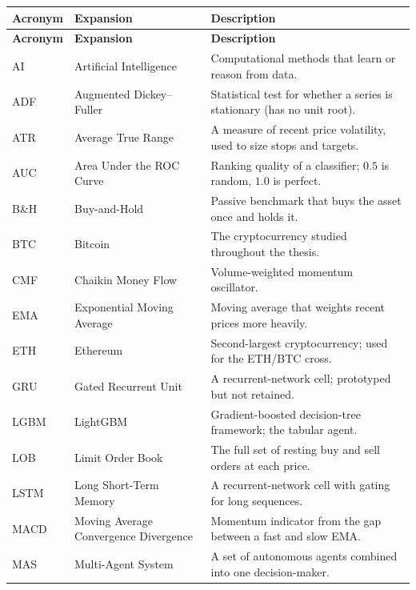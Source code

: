 \begin{onehalfspacing}
\renewcommand{\arraystretch}{1.2}
\small
\begin{longtable}{@{}l >{\raggedright\arraybackslash\hyphenpenalty=10000\exhyphenpenalty=10000}p{3.5cm} >{\raggedright\arraybackslash\hyphenpenalty=10000\exhyphenpenalty=10000}p{6.6cm}@{}}
\toprule
\textbf{Acronym} & \textbf{Expansion} & \textbf{Description} \\
\midrule
\endfirsthead
\toprule
\textbf{Acronym} & \textbf{Expansion} & \textbf{Description} \\
\midrule
\endhead
AI    & Artificial Intelligence            & Computational methods that learn or reason from data. \\
ADF   & Augmented Dickey--Fuller           & Statistical test for whether a series is stationary (has no unit root). \\
ATR   & Average True Range                 & A measure of recent price volatility, used to size stops and targets. \\
AUC   & Area Under the ROC Curve           & Ranking quality of a classifier; $0.5$ is random, $1.0$ is perfect. \\
B\&H  & Buy-and-Hold                       & Passive benchmark that buys the asset once and holds it. \\
BTC   & Bitcoin                            & The cryptocurrency studied throughout the thesis. \\
CMF   & Chaikin Money Flow                 & Volume-weighted momentum oscillator. \\
EMA   & Exponential Moving Average         & Moving average that weights recent prices more heavily. \\
ETH   & Ethereum                           & Second-largest cryptocurrency; used for the ETH/BTC cross. \\
GRU   & Gated Recurrent Unit               & A recurrent-network cell; prototyped but not retained. \\
LGBM  & LightGBM                           & Gradient-boosted decision-tree framework; the tabular agent. \\
LOB   & Limit Order Book                   & The full set of resting buy and sell orders at each price. \\
LSTM  & Long Short-Term Memory             & A recurrent-network cell with gating for long sequences. \\
MACD  & Moving Average Convergence Divergence & Momentum indicator from the gap between a fast and slow EMA. \\
MAS   & Multi-Agent System                 & A set of autonomous agents combined into one decision-maker. \\

\end{longtable}
\end{onehalfspacing}
